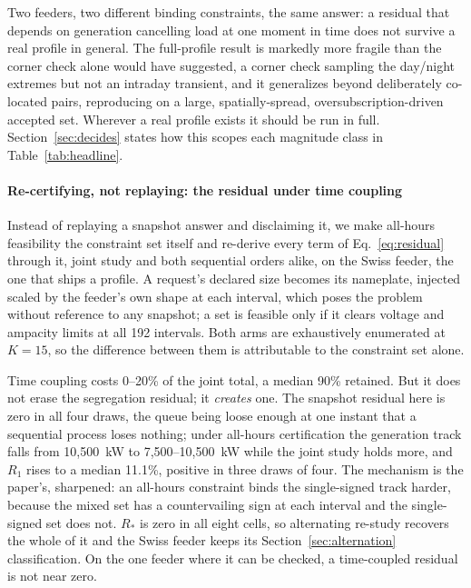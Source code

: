 \documentclass[review,authoryear,12pt]{elsarticle}
\begin{document}
Two feeders, two different binding constraints, the same answer: a residual
that depends on generation cancelling load at one moment in time does not
survive a real profile in general. The full-profile result is markedly more
fragile than the corner check alone would have suggested, a corner check
sampling the day/night extremes but not an intraday transient, and it
generalizes beyond deliberately co-located pairs, reproducing on a large,
spatially-spread, oversubscription-driven accepted set. Wherever a real
profile exists it should be run in full. Section~\ref{sec:decides} states how
this scopes each magnitude class in Table~\ref{tab:headline}.

\paragraph{Re-certifying, not replaying: the residual under time coupling}
Instead of replaying a snapshot answer and disclaiming it, we make all-hours
feasibility the constraint set itself and re-derive every term of
Eq.~\eqref{eq:residual} through it, joint study and both sequential orders
alike, on the Swiss feeder, the one that ships a profile. A request's
declared size becomes its nameplate, injected scaled by the feeder's own shape
at each interval, which poses the problem without reference to any snapshot; a
set is feasible only if it clears voltage and ampacity limits at all 192
intervals. Both arms are exhaustively enumerated at $K=15$, so the difference
between them is attributable to the constraint set alone.

Time coupling costs 0--20\% of the joint total, a median 90\% retained. But it
does not erase the segregation residual; it \emph{creates} one. The
snapshot residual here is zero in all four draws, the queue being loose enough
at one instant that a sequential process loses nothing; under all-hours
certification the generation track falls from 10{,}500~kW to
7{,}500--10{,}500~kW while the joint study holds more, and $R_1$ rises to a
median 11.1\%, positive in three draws of four. The mechanism is the paper's,
sharpened: an all-hours constraint binds the single-signed track harder,
because the mixed set has a countervailing sign at each interval and the
single-signed set does not. $R_{\ast}$ is zero in all eight cells, so
alternating re-study recovers the whole of it and the Swiss feeder keeps its
Section~\ref{sec:alternation} classification. On the one feeder where it can
be checked, a time-coupled residual is not near zero.
\end{document}
